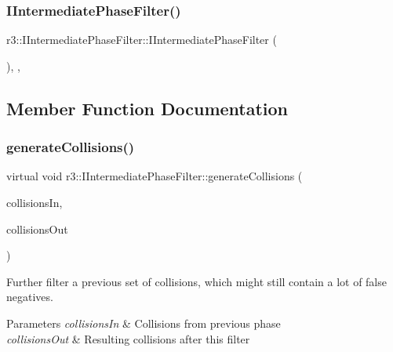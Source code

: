 \subsubsection{\texorpdfstring{I\+Intermediate\+Phase\+Filter()}{IIntermediatePhaseFilter()}}
{\footnotesize\ttfamily r3\+::\+I\+Intermediate\+Phase\+Filter\+::\+I\+Intermediate\+Phase\+Filter (\begin{DoxyParamCaption}{ }\end{DoxyParamCaption})\hspace{0.3cm}{\ttfamily [explicit]}, {\ttfamily [protected]}, {\ttfamily [default]}}



\subsection{Member Function Documentation}
\mbox{\label{classr3_1_1_i_intermediate_phase_filter_aea93ab8a004408c54409b27961db6425}} 
\subsubsection{\texorpdfstring{generate\+Collisions()}{generateCollisions()}}
{\footnotesize\ttfamily virtual void r3\+::\+I\+Intermediate\+Phase\+Filter\+::generate\+Collisions (\begin{DoxyParamCaption}\item[{const \mbox{\hyperlink{classr3_1_1_fixed_size_container}{Fixed\+Size\+Container}}$<$ \mbox{\hyperlink{classr3_1_1_collision_pair}{Collision\+Pair}} $>$ \&}]{collisions\+In,  }\item[{\mbox{\hyperlink{classr3_1_1_fixed_size_container}{Fixed\+Size\+Container}}$<$ \mbox{\hyperlink{classr3_1_1_collision_pair}{Collision\+Pair}} $>$ \&}]{collisions\+Out }\end{DoxyParamCaption})\hspace{0.3cm}{\ttfamily [pure virtual]}}



Further filter a previous set of collisions, which might still contain a lot of false negatives. 


\begin{DoxyParams}{Parameters}
{\em collisions\+In} & Collisions from previous phase \\
\hline
{\em collisions\+Out} & Resulting collisions after this filter \\
\hline
\end{DoxyParams}


